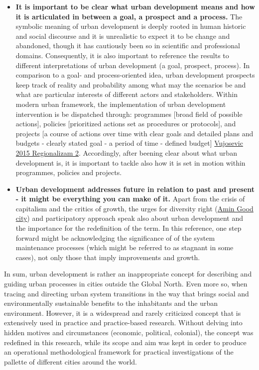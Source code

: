 \documentclass[11pt]{report}
\begin{document}
{\begin{itemize}
\item \textbf{It is important to be clear what urban development means and how it is articulated in between a goal, a prospect and a process.}
The symbolic meaning of urban development is deeply rooted in human historic and social discourse and it is unrealistic to expect it to be change and abandoned, though it has cautiously been so in scientific and professional domains. 
Consequently, it is also important to reference the results to different interpretations of urban development (a goal, prospect, process).
In comparison to a goal- and process-oriented idea, urban development prospects keep track of reality and probability among what may the scenarios be and what are particular interests of different actors and stakeholders.
Within modern urban framework, the implementation of urban development intervention is be dispatched through:
programmes [broad field of possible actions],
policies [prioritized actions set as procedures or protocols],
and
projects [a course of actions over time with clear goals and detailed plans and budgets - clearly stated goal - a period of time - defined budget] \href{}{Vujosevic 2015 Regionalizam 2}.
Accordingly, after beening clear about what urban development is, it is important to tackle also how it is set in motion within programmes, policies and projects.

\item \textbf{Urban development addresses future in relation to past and present - it might be everything you can make of it.}
Apart from the crisis of capitalism and the critics of growth, the
urges for diversity right (\href{}{Amin Good city}) and participatory approach speak also about urban development and the importance for the redefinition of the term. 
In this reference, one step forward might be acknowledging the significance of of the system maintenance processes (which might be referred to as stagnant in some cases), not only those that imply improvements and growth.
\end{itemize}

In sum, urban development is rather an inappropriate concept for describing and guiding urban processes in cities outside the Global North.
Even more so, when tracing and directing urban system transitions in the way that brings social and environmentally sustainable benefits to the inhabitants and the urban environment.
However, it is a widespread and rarely criticized concept that is extensively used in practice and practice-based research.
Without delving into hidden motives and circumstances (economic, political, colonial), the concept was redefined in this research, while its scope and aim was kept in order to produce an operational methodological framework for practical investigations of the pallette of different cities around the world.

}
\end{document}
